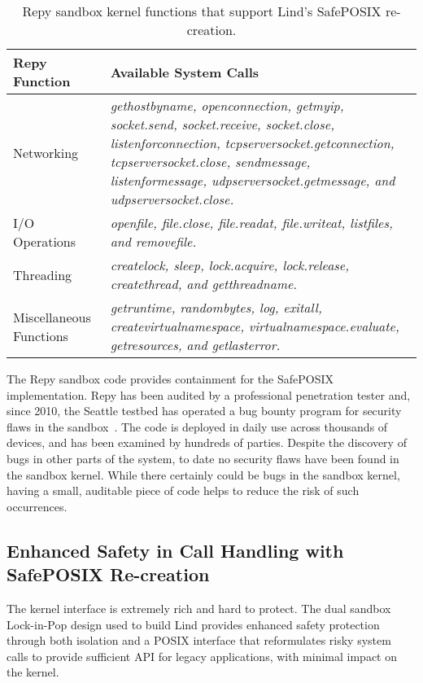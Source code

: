 \begin{table}
\centering
\caption {Repy sandbox kernel functions that support Lind's SafePOSIX re-creation.}

  \begin{tabular}{ | p{2.5cm} | p{4.5cm} |}
  \hline
  \textbf{Repy Function} & \textbf{Available System Calls}  \\ \hline

Networking & \emph{gethostbyname, openconnection, getmyip, socket.send, socket.receive, socket.close,
listenforconnection, tcpserversocket.getconnection, tcpserversocket.close, sendmessage, listenformessage,
udpserversocket.getmessage, and udpserversocket.close.} \\ \hline

I/O Operations & \emph{openfile, file.close, file.readat, file.writeat, listfiles, and removefile.} \\ \hline

Threading & \emph{createlock, sleep, lock.acquire, lock.release, createthread, and getthreadname.} \\ \hline

Miscellaneous Functions & \emph{getruntime, randombytes, log, exitall, createvirtualnamespace,
virtualnamespace.evaluate, getresources, and getlasterror.}  \\ \hline
    \end{tabular}
    \label{table:RepyKernel}
\end{table}

The Repy sandbox code provides containment for the SafePOSIX implementation.
Repy has been audited by a professional penetration tester and, since 2010,
the Seattle testbed has operated a bug bounty program for security flaws in the
sandbox~\cite{seattle}.
The code is deployed in daily use across thousands of devices, and has been examined by
hundreds of parties. Despite the discovery of bugs in other parts of the 
system, to date no security flaws have been found in the sandbox
kernel. While there certainly could be bugs in the sandbox kernel, having a 
small, auditable piece of code helps to reduce the risk of such occurrences.

\subsection{Enhanced Safety in Call Handling with SafePOSIX Re-creation}

The kernel interface is extremely rich and hard to protect.
The dual sandbox Lock-in-Pop design used to build Lind provides enhanced
safety protection through both isolation and a POSIX interface that
reformulates risky system calls to
provide sufficient API for legacy applications, with minimal impact on the kernel.

